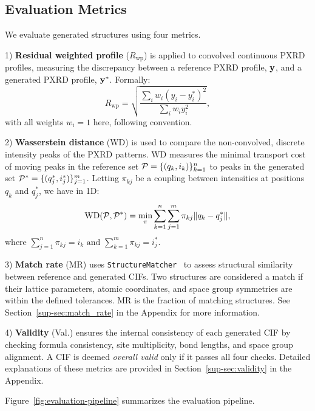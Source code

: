 \subsection{Evaluation Metrics}

We evaluate generated structures using four metrics. 

1) {\bf Residual weighted profile} ($R_{\mathrm{wp}}$) is applied to convolved continuous PXRD profiles, measuring the discrepancy between a reference PXRD profile, ${\mathbf y}$, and a generated PXRD profile, ${\mathbf y}^*$. Formally:
\vspace{-0.2cm}
\begin{equation}
        R_\mathrm{wp} = \sqrt{\frac{\sum_{i} w_i (y_i - y_i^*)^2}{\sum_{i} w_i y_i^2}},
\end{equation}
with all weights $w_i = 1$ here, following convention.

2) {\bf Wasserstein distance} (WD) is used to compare the non-convolved, discrete intensity peaks of the PXRD patterns. WD measures the minimal transport cost of moving peaks in the reference set ${\mathcal P} = \{(q_k,i_k)\}_{k=1}^n$ to peaks in the generated set ${\mathcal P}^* = \{(q_j^*,i_j^*)\}_{j=1}^m$. Letting $\pi_{kj}$ be a coupling between intensities at positions $q_k$ and $q_j^*$, we have in 1D:
\begin{equation}
    \mathrm{WD}({\mathcal P}, {\mathcal P}^*) = \min_{\pi} \sum_{k=1}^{n} \sum_{j=1}^{m} \pi_{kj} \| q_k - q_j^* \|,
\end{equation}
where $\sum_{j=1}^{n} \pi_{kj} = i_k \text{ and } \sum_{k=1}^{m} \pi_{kj} = i_j^*$.

3) {\bf Match rate} (MR) uses \texttt{\small StructureMatcher}~\cite{Ong2013} to assess structural similarity between reference and generated CIFs. Two structures are considered a match if their lattice parameters, atomic coordinates, and space group symmetries are within the defined tolerances. MR is the fraction of matching structures. See Section~\ref{sup-sec:match_rate} in the Appendix for more information.

4) {\bf Validity} (Val.) ensures the internal consistency of each generated CIF by checking formula consistency, site multiplicity, bond lengths, and space group alignment. A CIF is deemed \textit{overall valid} only if it passes all four checks. Detailed explanations of these metrics are provided in Section~\ref{sup-sec:validity} in the Appendix.

Figure~\ref{fig:evaluation-pipeline} summarizes the evaluation pipeline.

